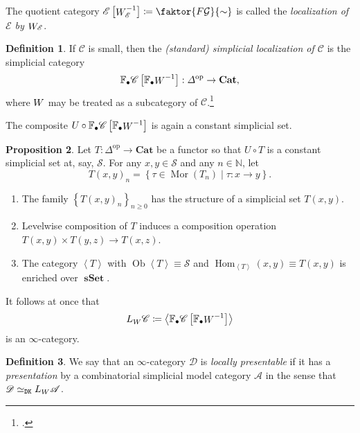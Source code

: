 \documentclass[10pt,letterpaper,cm]{nupset}
\theoremstyle{definition}
\newtheorem{definition}{Definition}[subsection]
\theoremstyle{theorem}
\newtheorem{prop}[definition]{Proposition}
\theoremstyle{remark}
\DeclareMathOperator{\ob}{Ob}
\DeclareMathOperator{\mor}{Mor}
\newcommand{\0}{\mathbf{0}}
\newcommand{\1}{\mathbf{1}}
\newcommand{\2}{\mathbf{2}}
\DeclareMathOperator{\op}{op}
\DeclareMathOperator{\sset}{\mathbf{sSet}}
\renewcommand{\c}{\mathscr{C}}
\renewcommand{\d}{\mathscr{D}}
\newcommand{\e}{\mathscr{E}}
\newcommand{\N}{\mathbb N}
\DeclareMathOperator{\Hom}{Hom}
\DeclareMathOperator{\we}{\mathnormal{W}}
\newcommand{\be}{\begin{enumerate}}
\newcommand{\ee}{\end{enumerate}}
\begin{document}
The quotient category $\e\left[\we_{\e}^{-1}\right] \coloneqq \faktor{F{\mathcal{G}}}{\sim}$ is called the \textit{localization of $\e$ by $\we_{\e}$}.

\smallskip

\begin{definition}
If $\c$ is small, then the \textit{(standard) simplicial localization of $\c$} is the simplicial category $$\mathbb{F}_{\bullet}{\c}\left[\mathbb{F}_{\bullet}{\we}^{-1}\right] : \varDelta^{\op} \to \mathbf{Cat},$$ where $\we$ may be treated as a subcategory of $\c$.\footnote{\autocite[Section 4.1]{DKan}.}
\end{definition}

The composite $U\circ \mathbb{F}_{\bullet}{\c}\left[\mathbb{F}_{\bullet}{\we}^{-1}\right]$ is again a constant simplicial set.

\begin{prop}
Let $T : \varDelta^{\op} \to \mathbf{Cat}$ be a functor so that $U\circ T$ is a constant simplicial set at, say, $\mathcal{S}$. For any $x,y\in \mathcal{S}$ and any $n\in \N$, let
\[
T(x,y)_n =\left\{ \tau \in \mor(T_n) \mid \tau : x\to y\right\}.
\] 
\be[label=(\alph*)]
\item The family $\left\{T(x,y)_n\right\}_{n\geq 0}$ has the structure of a simplicial set $T(x,y)$.
\item Levelwise composition of $T$ induces a composition operation $T(x,y) \times T(y,z) \to T(x,z)$.
\item The category $\left\langle T \right\rangle$ with $\ob{\left\langle T \right\rangle} \equiv \mathcal{S}$ and $\Hom_{\left\langle T \right\rangle}(x,y) \equiv T(x,y)$ is enriched over $\sset$.
\ee

\end{prop}

It follows at once that $$L_{\we}{\c} \coloneqq \left\langle\mathbb{F}_{\bullet}{\c}\left[\mathbb{F}_{\bullet}{\we}^{-1}\right]\right\rangle$$ is an $\infty$-category.

\begin{definition}
We say that an $\infty$-category $\d$ is \textit{locally presentable} if it has a \textit{presentation} by a combinatorial simplicial model category  $\mathscr{A}$   in the sense that $\d \simeq_{\mathtt{DK}} L_{\we}{\mathscr{A}}$.
\end{definition}
\end{document}
